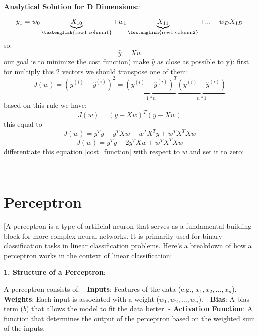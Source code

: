 \documentclass{article}
\renewcommand\text[1]{\textnormal{\textenglish{#1}}}
\newenvironment{cheatformula}[1][כותרת]{
    \begin{minipage}{\linewidth}
    \textbf{#1}:
}{
    \end{minipage}\\[0ex]
}
\begin{document}
\begin{multicols*}{2}
\begin{cheatformula}[Analytical Solution for D Dimensions:]
\begin{equation}
y_{1} = w_{0}\underbrace{X_{10}}_{\text{row1 column1}} + w_{1}\underbrace{X_{11}}_{\text{row1 column2}} + ... + w_{D}X_{1D}
\end{equation}
so: 
\begin{equation}
\widehat{y} = X w
\end{equation}
our goal is to minimize the cost function( make $\widehat{y}$ as close as possible to y):
first for multiply this 2 vectors we should transpose one of them:
\begin{equation}
J(w) =  (y^{(i)} -  \widehat{y}^{(i)})^{2} = \underbrace{(y^{(i)} - \widehat{y}^{(i)})^{T}}_{1*n} \underbrace{(y^{(i)} - \widehat{y}^{(i)})}_{n*1}
\end{equation}
based on this rule we have:
\begin{equation}
J(w) = (y - Xw)^{T}(y - Xw)
\end{equation}
this equal to
\begin{equation}
J(w) = y^{T}y - y^{T}Xw - w^{T}X^{T}y + w^{T}X^{T}Xw
\end{equation}
\begin{equation}
J(w) = y^{T}y - 2y^{T}Xw + w^{T}X^{T}Xw
\label{eq:cost_function}
\end{equation}
differentiate this equation \eqref{cost_function} with respect to $w$ and set it to zero:
$$  $$


\end{cheatformula}

\pagebreak

\section{Perceptron}[A perceptron is a type of artificial neuron that serves
 as a fundamental building block for more complex neural
  networks. It is primarily used for binary classification
   tasks in linear classification problems. 
   Here’s a breakdown of how a perceptron works in the
    context of linear classification:]

\begin{cheatformula}[1. Structure of a Perceptron]
  A perceptron consists of:
  - \textbf{Inputs}: Features of the data (e.g., $x_1, x_2, \ldots, x_n$).
  - \textbf{Weights}: Each input is associated with a weight ($w_1, w_2, \ldots, w_n$).
  - \textbf{Bias}: A bias term ($b$) that allows the model to fit the data better.
  - \textbf{Activation Function}: A function that determines the output of the perceptron based on the weighted sum of the inputs.
  \end{cheatformula}


\end{multicols*}
\end{document}
